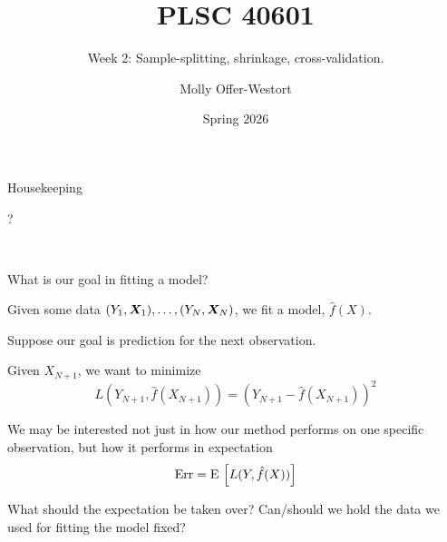 \documentclass[xcolor={table}, handout]{beamer}
\title{PLSC 40601}
\subtitle{Week 2: Sample-splitting, shrinkage, cross-validation.}
\date{Spring 2026}
\author{Molly Offer-Westort}
\institute{Department of Political Science, \\University of Chicago}
\begin{document}



\frame{\titlepage
\thispagestyle{empty}
}
\begin{frame}{Housekeeping}

\begin{wideitemize}
\item ?
\end{wideitemize}

\end{frame}



\begin{transitionframe}
\centering

\LARGE \textcolor{white}{Sample splitting.}

\end{transitionframe}
\begin{frame}{What is our goal in fitting a model?}

\pause
\begin{wideitemize}
\item Given some data $(Y_1, \bm{X}_1), \dots, (Y_N, \bm{X}_N)$, we fit a model, $\hat{f}(X)$.\pause
\item Suppose our goal is prediction for the next observation. \pause
\item Given $X_{N+1}$, we want to minimize
\[
L\left(Y_{N+1}, \hat{f}(X_{N+1})\right) = \left(Y_{N+1} - \hat{f}(X_{N+1})\right)^2
\]\pause
\item We may be interested not just in how our method performs on one specific observation, but how it performs in expectation
\[
\textrm{Err} = {\textrm E}\, \left[ L(Y, \hat{f}(X))\right]
\]\pause
\item What should the expectation be taken over? \pause Can/should we hold the data we used for fitting the model fixed?
\end{wideitemize}

\end{frame}
\end{document}
